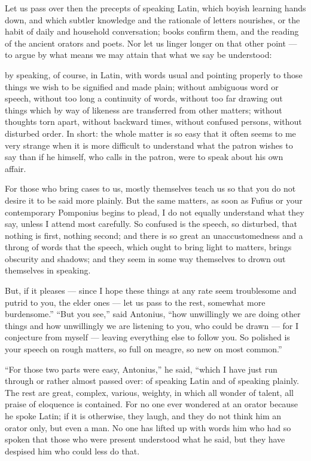  Let us pass over then the precepts of speaking Latin, which boyish learning hands down, and which subtler knowledge and the rationale of letters nourishes, or the habit of daily and household conversation; books confirm them, and the reading of the ancient orators and poets. Nor let us linger longer on that other point — to argue by what means we may attain that what we say be understood:

 by speaking, of course, in Latin, with words usual and pointing properly to those things we wish to be signified and made plain; without ambiguous word or speech, without too long a continuity of words, without too far drawing out things which by way of likeness are transferred from other matters; without thoughts torn apart, without backward times, without confused persons, without disturbed order. In short: the whole matter is so easy that it often seems to me very strange when it is more difficult to understand what the patron wishes to say than if he himself, who calls in the patron, were to speak about his own affair.

 For those who bring cases to us, mostly themselves teach us so that you do not desire it to be said more plainly. But the same matters, as soon as Fufius or your contemporary Pomponius begins to plead, I do not equally understand what they say, unless I attend most carefully. So confused is the speech, so disturbed, that nothing is first, nothing second; and there is so great an unaccustomedness and a throng of words that the speech, which ought to bring light to matters, brings obscurity and shadows; and they seem in some way themselves to drown out themselves in speaking.

 But, if it pleases — since I hope these things at any rate seem troublesome and putrid to you, the elder ones — let us pass to the rest, somewhat more burdensome.'' ``But you see,'' said Antonius, ``how unwillingly we are doing other things and how unwillingly we are listening to you, who could be drawn — for I conjecture from myself — leaving everything else to follow you. So polished is your speech on rough matters, so full on meagre, so new on most common.''

 ``For those two parts were easy, Antonius,'' he said, ``which I have just run through or rather almost passed over: of speaking Latin and of speaking plainly. The rest are great, complex, various, weighty, in which all wonder of talent, all praise of eloquence is contained. For no one ever wondered at an orator because he spoke Latin; if it is otherwise, they laugh, and they do not think him an orator only, but even a man. No one has lifted up with words him who had so spoken that those who were present understood what he said, but they have despised him who could less do that.

